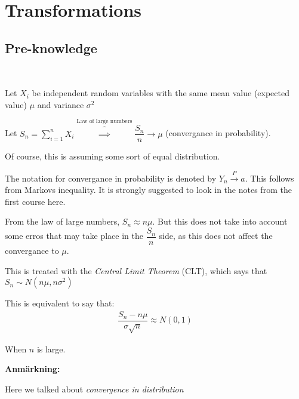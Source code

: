 \section{Transformations}\par
\subsection{Pre-knowledge}\hfill\\
\par\bigskip
\noindent Let $X_i$ be independent random variables with the same mean value (expected value) $\mu$ and variance $\sigma^2$ \par
Let $S_n = \sum_{i=1}^{n}X_i\overbrace{\implies}^{\text{Law of large numbers}}\dfrac{S_n}{n}\to\mu$ (convergance in probability).\par
\noindent Of course, this is assuming some sort of equal distribution. 
\par\bigskip
The notation for convergance in probability is denoted by $Y_n\stackrel{P}{\to}a$. This follows from Markovs inequality. It is strongly suggested to look in the notes from the first course here. 
\par\bigskip
From the law of large numbers, $S_n\approx n\mu$. But this does not take into account some erros that may take place in the $\dfrac{S_n}{n}$ side, as this does not affect the convergance to $\mu$.\par
This is treated with the \textit{Central Limit Theorem}  (CLT), which says that $S_n\sim N(n\mu,n\sigma^2)$ 
\par\bigskip
\noindent This is equivalent to say that:
\begin{equation*}
  \begin{gathered}
    \dfrac{S_n-n\mu}{\sigma\sqrt{n}}\approx N(0,1)
  \end{gathered}
\end{equation*}

When $n$ is large.
\par\bigskip
\noindent\textbf{Anmärkning:}\par
\noindent Here we talked about \textit{convergence in distribution} 
